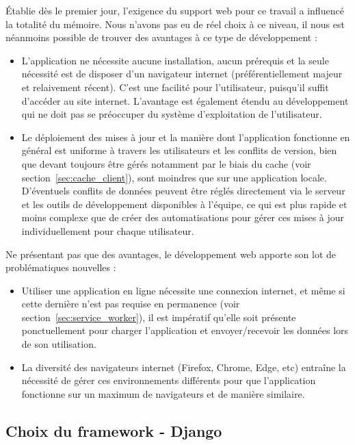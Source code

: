 \documentclass{EPL-master-thesis-covers-FR}
\begin{document}
				\'Etablie dès le premier jour, l'exigence du support web pour ce travail a influencé la totalité du mémoire. Nous n'avons pas eu de réel choix à ce niveau, il nous est néanmoins possible de trouver des avantages à ce type de développement :
				\begin{itemize}
					\item L'application ne nécessite aucune installation, aucun prérequis et la seule nécessité est de disposer d'un navigateur internet (préférentiellement majeur et relaivement récent). C'est une facilité pour l'utilisateur, puisqu'il suffit d'accéder au site internet. L'avantage est également étendu au développement qui ne doit pas se préoccuper du système d'exploitation de l'utilisateur.
					\item Le déploiement des mises à jour et la manière dont l'application fonctionne en général est uniforme à travers les utilisateurs et les conflits de version, bien que devant toujours être gérés notamment par le biais du cache (voir section~\ref{sec:cache_client}), sont moindres que sur une application locale. D'éventuels conflits de données peuvent être réglés directement via le serveur et les outils de développement disponibles à l'équipe, ce qui est plus rapide et moins complexe que de créer des automatisations pour gérer ces mises à jour individuellement pour chaque utilisateur.
				\end{itemize}

				Ne présentant pas que des avantages, le développement web apporte son lot de problématiques nouvelles :
				\begin{itemize}
					\item Utiliser une application en ligne nécessite une connexion internet, et même si cette dernière n'est pas requise en permanence (voir section~\ref{sec:service_worker}), il est impératif qu'elle soit présente ponctuellement pour charger l'application et envoyer/recevoir les données lors de son utilisation.
					\item La diversité des navigateurs internet (Firefox, Chrome, Edge, etc) entraîne la nécessité de gérer ces environnements différents pour que l'application fonctionne sur un maximum de navigateurs et de manière similaire.
				\end{itemize}

			\subsection*{Choix du framework - Django}
\end{document}
